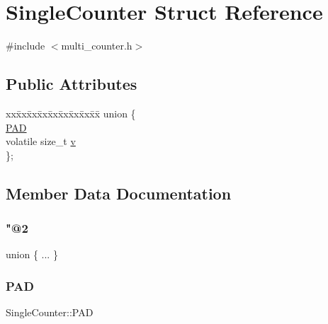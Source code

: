 \hypertarget{structSingleCounter}{}\section{Single\+Counter Struct Reference}
\label{structSingleCounter}


{\ttfamily \#include $<$multi\+\_\+counter.\+h$>$}

\subsection*{Public Attributes}
\begin{DoxyCompactItemize}
\item 
\begin{tabbing}
xx\=xx\=xx\=xx\=xx\=xx\=xx\=xx\=xx\=\kill
union \{\\
\>\hyperlink{structSingleCounter_a1eaa8b82970740ea5e36d4c171ccc86a}{PAD}\\
\>volatile size\_t \hyperlink{structSingleCounter_a584b30254d2b6e5cb188a7ac658bddb0}{v}\\
\}; \\

\end{tabbing}\end{DoxyCompactItemize}


\subsection{Member Data Documentation}
\mbox{\label{structSingleCounter_a46a1661a50236419b513aafdc6b05c1e}} 
\subsubsection{\texorpdfstring{"@2}{@2}}
{\footnotesize\ttfamily union \{ ... \} }

\mbox{\label{structSingleCounter_a1eaa8b82970740ea5e36d4c171ccc86a}} 
\subsubsection{\texorpdfstring{P\+AD}{PAD}}
{\footnotesize\ttfamily Single\+Counter\+::\+P\+AD}

\mbox{\label{structSingleCounter_a584b30254d2b6e5cb188a7ac658bddb0}} 
